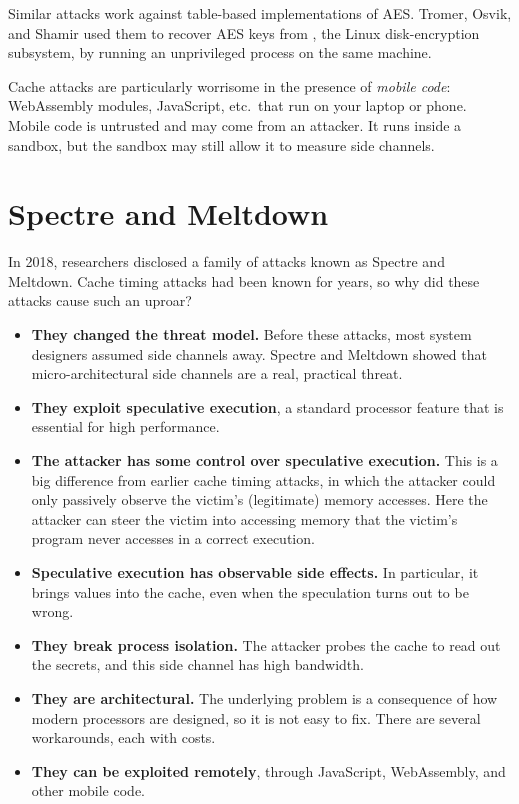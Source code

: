 Similar attacks work against table-based implementations of AES.
Tromer, Osvik, and Shamir used them to recover AES keys from
, the Linux disk-encryption subsystem, by running an
unprivileged process on the same machine.\autocite{tromer:cache-aes}

Cache attacks are particularly worrisome in the presence of
\emph{mobile code}: WebAssembly modules, JavaScript, etc.\ that run on
your laptop or phone.
Mobile code is untrusted and may come from an attacker.
It runs inside a sandbox, but the sandbox may still allow it to measure
side channels.

\section{Spectre and Meltdown}
\label{sec:sc:spectre}

In 2018, researchers disclosed a family of attacks known as Spectre and
Meltdown.\autocite{kocher:spectre,lipp:meltdown,hill:spectre-meltdown}
Cache timing attacks had been known for years, so why did these attacks
cause such an uproar?

\begin{itemize}
  \item \textbf{They changed the threat model.}
        Before these attacks, most system designers assumed side channels
        away.
        Spectre and Meltdown showed that micro-architectural side channels
        are a real, practical threat.
  \item \textbf{They exploit speculative execution}, a standard processor
        feature that is essential for high performance.
  \item \textbf{The attacker has some control over speculative execution.}
        This is a big difference from earlier cache timing attacks, in which
        the attacker could only passively observe the victim's
        (legitimate) memory accesses.
        Here the attacker can steer the victim into accessing memory that
        the victim's program never accesses in a correct execution.
  \item \textbf{Speculative execution has observable side effects.}
        In particular, it brings values into the cache, even when the
        speculation turns out to be wrong.
  \item \textbf{They break process isolation.}
        The attacker probes the cache to read out the secrets, and this
        side channel has high bandwidth.
  \item \textbf{They are architectural.}
        The underlying problem is a consequence of how modern processors
        are designed, so it is not easy to fix.
        There are several workarounds, each with costs.
  \item \textbf{They can be exploited remotely},
        through JavaScript, WebAssembly, and other mobile code.
\end{itemize}

